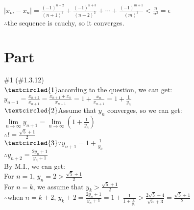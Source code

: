 \documentclass{article}
\begin{document}
$\displaystyle |x_m-x_n|=\frac{(-1)^{n+2}}{(n+1)^3}+\frac{(-1)^{n+3}}{(n+2)^3}+\cdots+\frac{(-1)^{m+1}}{(m)^3}<\frac{n}{n^3}=\epsilon$\\

$\therefore$\qquad the sequence is cauchy, so it converges.\\

\section{\textcolor[rgb]{0.70,0.00,0.00}{Part \uppercase\expandafter{}}}


\vspace{3.5mm}

\textcolor[rgb]{0.00,0.00,0.50}{\#1 (\#1.3.12)}\\

$\textcircled{1}$\qquad according to the question, we can get:\\

\quad\qquad$\displaystyle y_{n+1}=\frac{x_{n+2}}{x_{n+1}}=\frac{x_{n+1}+x_n}{x_{n+1}}=1+\frac{x_n}{x_{n+1}}=1+\frac{1}{y_n}$\\

$\textcircled{2}$\qquad Assume that $y_n$ converges, so we can get:\\

\quad\qquad$\lim \limits_{n \to \infty}y_{n+1}=\lim \limits_{n \to \infty}\left(1+\frac{1}{y_n}\right)$\\

\quad\qquad$\therefore$\qquad$\displaystyle l=\frac{\sqrt{5}+1}{2}$\\

$\textcircled{3}$\qquad$\because$\qquad$\displaystyle y_{n+1}=1+\frac{1}{y_n}$\\

\quad\qquad$\therefore$\qquad$\displaystyle y_{n+2}=\frac{2y_n+1}{y_n+1}$\\

\quad\qquad By M.I., we can get:\\

\quad\qquad For $n=1$, $\displaystyle y_n=2>\frac{\sqrt{5}+1}{2}$\\

\quad\qquad For $n=k$, we assume that $y_k>\displaystyle \frac{\sqrt{5}+1}{2}$\\

\quad\qquad$\therefore$\qquad when $n=k+2$, $\displaystyle y_k+2=\frac{2y_n+1}{y_n+1}=1+\frac{1}{1+\frac{1}{y_n}}>\frac{2\sqrt{5}+4}{\sqrt{5}+3}=\frac{\sqrt{5}+1}{2}$\\
\end{document}
